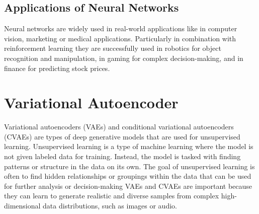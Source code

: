 \subsection{Applications of Neural Networks}


Neural networks are widely used in real-world applications like in computer vision, marketing or medical applications. Particularly in combination with reinforcement learning they are successfully used in robotics for object recognition and manipulation, in gaming for complex decision-making, and in finance for predicting stock prices.

% 

\section{Variational Autoencoder}

Variational autoencoders (VAEs) and conditional variational autoencoders (CVAEs) are types of deep generative models that are used for unsupervised learning. Unsupervised learning is a type of machine learning where the model is not given labeled data for training. Instead, the model is tasked with finding patterns or structure in the data on its own. The goal of unsupervised learning is often to find hidden relationships or groupings within the data that can be used for further analysis or decision-making
VAEs and CVAEs are important because they can learn to generate realistic and diverse samples from complex high-dimensional data distributions, such as images or audio.

